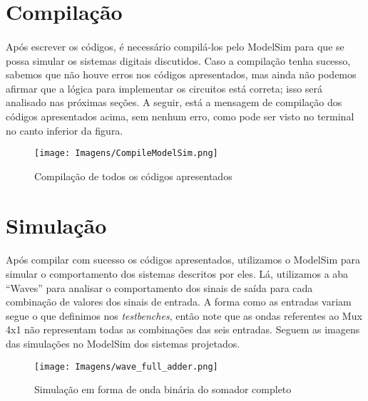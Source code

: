 \documentclass[a4paper,12pt]{article}
\begin{document}
\section{Compilação}
\paragraph{}
Após escrever os códigos, é necessário compilá-los pelo ModelSim para que se possa simular os sistemas digitais discutidos. Caso a compilação tenha sucesso, sabemos que não houve erros nos códigos apresentados, mas ainda não podemos afirmar que a lógica para implementar os circuitos está correta; isso será analisado nas próximas seções. A seguir, está a mensagem de compilação dos códigos apresentados acima, sem nenhum erro, como pode ser visto no terminal no canto inferior da figura.

\begin{figure}[H]
    \centering
    \texttt{[image: Imagens/CompileModelSim.png]}
    \caption{Compilação de todos os códigos apresentados}
\end{figure}

\section{Simulação}
\paragraph{}
Após compilar com sucesso os códigos apresentados, utilizamos o ModelSim para simular o comportamento dos sistemas descritos por eles. Lá, utilizamos a aba ``Waves'' para analisar o comportamento dos sinais de saída para cada combinação de valores dos sinais de entrada. A forma como as entradas variam segue o que definimos nos \textit{testbenches}, então note que as ondas referentes ao Mux 4x1 não representam todas as combinações das seis entradas. Seguem as imagens das simulações no ModelSim dos sistemas projetados.

\begin{figure}[H]
    \centering
    \begin{tcolorbox}[colframe=cinza, colback=white, boxrule=1pt, arc=0pt, width=1\textwidth, center, boxsep=0pt, left=0pt, right=0pt, top=0pt, bottom=0pt]
    \texttt{[image: Imagens/wave\_full\_adder.png]}
    \end{tcolorbox}
    \caption{Simulação em forma de onda binária do somador completo}
\end{figure}
\end{document}
